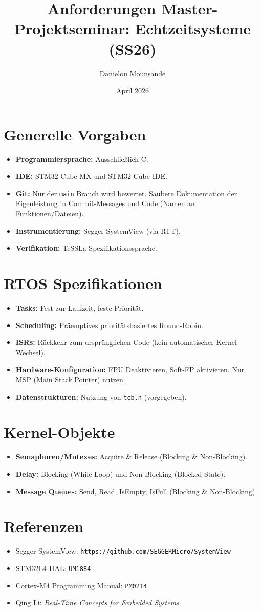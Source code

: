 \documentclass{article}
\title{Anforderungen Master-Projektseminar: Echtzeitsysteme (SS26)}
\author{Danielou Mounsande}
\date{April 2026}
\begin{document}
\maketitle

\section{Generelle Vorgaben}
\begin{itemize}
    \item \textbf{Programmiersprache:} Ausschließlich C.
    \item \textbf{IDE:} STM32 Cube MX und STM32 Cube IDE.
    \item \textbf{Git:} Nur der \texttt{main} Branch wird bewertet. Saubere Dokumentation der Eigenleistung in Commit-Messages und Code (Namen an Funktionen/Dateien).
    \item \textbf{Instrumentierung:} Segger SystemView (via RTT).
    \item \textbf{Verifikation:} TeSSLa Spezifikationssprache.
\end{itemize}

\section{RTOS Spezifikationen}
\begin{itemize}
    \item \textbf{Tasks:} Fest zur Laufzeit, feste Priorität.
    \item \textbf{Scheduling:} Präemptives prioritätsbasiertes Round-Robin.
    \item \textbf{ISRs:} Rückkehr zum ursprünglichen Code (kein automatischer Kernel-Wechsel).
    \item \textbf{Hardware-Konfiguration:} FPU Deaktivieren, Soft-FP aktivieren. Nur MSP (Main Stack Pointer) nutzen.
    \item \textbf{Datenstrukturen:} Nutzung von \texttt{tcb.h} (vorgegeben).
\end{itemize}

\section{Kernel-Objekte}
\begin{itemize}
    \item \textbf{Semaphoren/Mutexes:} Acquire \& Release (Blocking \& Non-Blocking).
    \item \textbf{Delay:} Blocking (While-Loop) und Non-Blocking (Blocked-State).
    \item \textbf{Message Queues:} Send, Read, IsEmpty, IsFull (Blocking \& Non-Blocking).
\end{itemize}

\section{Referenzen}
\begin{itemize}
    \item Segger SystemView: \texttt{https://github.com/SEGGERMicro/SystemView}
    \item STM32L4 HAL: \texttt{UM1884}
    \item Cortex-M4 Programming Manual: \texttt{PM0214}
    \item Qing Li: \textit{Real-Time Concepts for Embedded Systems}
\end{itemize}
\end{document}
